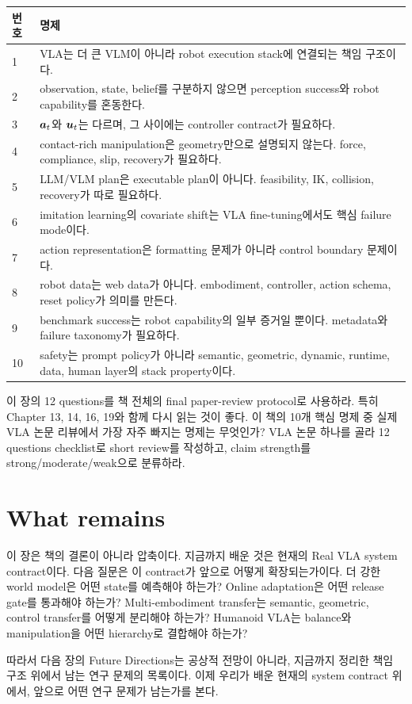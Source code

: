 \begin{center}
  \label{tab:ch21-ten-propositions}
  \begin{tabularx}{\linewidth}{p{8mm}X}
    \toprule
    번호 & 명제 \\
    \midrule
    1 & VLA는 더 큰 VLM이 아니라 robot execution stack에 연결되는 책임 구조이다. \\
    2 & observation, state, belief를 구분하지 않으면 perception success와 robot capability를 혼동한다. \\
    3 & $\bm{a}_t$와 $\bm{u}_t$는 다르며, 그 사이에는 controller contract가 필요하다. \\
    4 & contact-rich manipulation은 geometry만으로 설명되지 않는다. force, compliance, slip, recovery가 필요하다. \\
    5 & LLM/VLM plan은 executable plan이 아니다. feasibility, IK, collision, recovery가 따로 필요하다. \\
    6 & imitation learning의 covariate shift는 VLA fine-tuning에서도 핵심 failure mode이다. \\
    7 & action representation은 formatting 문제가 아니라 control boundary 문제이다. \\
    8 & robot data는 web data가 아니다. embodiment, controller, action schema, reset policy가 의미를 만든다. \\
    9 & benchmark success는 robot capability의 일부 증거일 뿐이다. metadata와 failure taxonomy가 필요하다. \\
    10 & safety는 prompt policy가 아니라 semantic, geometric, dynamic, runtime, data, human layer의 stack property이다. \\
    \bottomrule
  \end{tabularx}
\end{center}

\chapterwork
{이 장의 12 questions를 책 전체의 final paper-review protocol로 사용하라. 특히 Chapter 13, 14, 16, 19와 함께 다시 읽는 것이 좋다.}
{이 책의 10개 핵심 명제 중 실제 VLA 논문 리뷰에서 가장 자주 빠지는 명제는 무엇인가?}
{VLA 논문 하나를 골라 12 questions checklist로 short review를 작성하고, claim strength를 strong/moderate/weak으로 분류하라.}

\section{What remains}

이 장은 책의 결론이 아니라 압축이다. 지금까지 배운 것은 현재의 Real VLA system contract이다. 다음 질문은 이 contract가 앞으로 어떻게 확장되는가이다. 더 강한 world model은 어떤 state를 예측해야 하는가? Online adaptation은 어떤 release gate를 통과해야 하는가? Multi-embodiment transfer는 semantic, geometric, control transfer를 어떻게 분리해야 하는가? Humanoid VLA는 balance와 manipulation을 어떤 hierarchy로 결합해야 하는가?

따라서 다음 장의 Future Directions는 공상적 전망이 아니라, 지금까지 정리한 책임 구조 위에서 남는 연구 문제의 목록이다. 이제 우리가 배운 현재의 system contract 위에서, 앞으로 어떤 연구 문제가 남는가를 본다.
